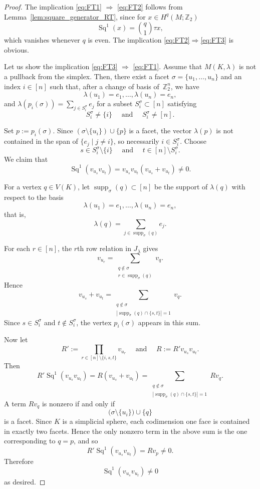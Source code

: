 \documentclass[10pt,a4paper]{amsart}
\DeclareMathOperator{\Sq}{Sq}
\newcommand{\Z}{\mathbb{Z}}
\newcommand{\supp}{\operatorname{supp}}
\begin{document}
\begin{proof}
    The implication \eqref{eq:FT1} $\Rightarrow$ \eqref{eq:FT2} follows from Lemma~\ref{lem:square_generator_RT}, since for $x \in H^q(M;\Z_2)$
    $$
    \Sq^1(x) = \binom{q}{1}\tau x,
    $$
    which vanishes whenever $q$ is even.
    The implication \eqref{eq:FT2}$\Rightarrow$\eqref{eq:FT3} is obvious.
    
    Let us show the implication \eqref{eq:FT3} $\Rightarrow$ \eqref{eq:FT1}.
    Assume that $M(K,\lambda)$ is not a pullback from the simplex. 
    Then, there exist a facet $\sigma=\{u_1,\dots,u_n\}$ and an index $i\in[n]$ such that, after a change of basis of~$\Z_2^n$, we have
    $$
        \lambda(u_1)=e_1,\dots,\lambda(u_n)=e_n,
    $$ and $\lambda(p_i (\sigma))=\sum_{j\in S_i^\sigma}e_j$ for a subset $S_i^\sigma \subset[n]$ satisfying
    $$
        S_i^\sigma \neq \{i\} \quad \text{ and }\quad S_i^\sigma \neq [n].
    $$
    
    Set $p:=p_i (\sigma)$.
    Since $(\sigma\setminus\{u_i\})\cup\{p\}$ is a facet, the vector $\lambda(p)$ is not contained in the span of $\{e_j\mid j\neq i\}$, so necessarily $i\in S_i^\sigma$.
    Choose
    $$
        s\in S_i^\sigma \setminus\{i\} \quad \text{ and } \quad t \in [n]\setminus S_i^\sigma.
    $$
    We claim that
    $$
        \Sq^1(v_{u_s} v_{u_t})= v_{u_s} v_{u_t}(v_{u_s} + v_{u_t})\neq 0.
    $$
    
    For a vertex $q \in V(K)$, let $\supp_\sigma(q)\subset[n]$ be the support of $\lambda(q)$ with respect to the basis
    $$
        \lambda(u_1)=e_1,\dots,\lambda(u_n)=e_n,
    $$
    that is,
    $$
        \lambda(q)=\sum_{j\in \supp_\sigma(q)} e_j.
    $$
    
    For each $r\in[n]$, the $r$th row relation in $J_\lambda$ gives
    $$
        v_{u_r} = \sum_{\substack{q\notin \sigma\\ r\in \supp_\sigma(q)}} v_q.
    $$
    Hence
    $$
    v_{u_s}+v_{u_t} = \sum_{\substack{q\notin \sigma\\ |\supp_\sigma(q)\cap\{s,t\}|=1}} v_q.
    $$
    Since $s\in S_i^\sigma$ and $t\notin S_i^\sigma$, the vertex $p_i(\sigma)$ appears in this sum.
    
    Now let
    $$
        R':=\prod_{r\in[n]\setminus\{i,s,t\}} v_{u_r} \quad \text{ and } \quad R := R' v_{u_s} v_{u_t}.
    $$
    Then
    $$
        R' \Sq^1(v_{u_s}v_{u_t}) = R(v_{u_s}+v_{u_t}) = \sum_{\substack{q\notin \sigma\\ |\supp_\sigma(q)\cap\{s,t\}|=1}} Rv_q.
    $$
    A term $Rv_q$ is nonzero if and only if
    $$
        \bigl(\sigma\setminus\{u_i\}\bigr)\cup\{q\}
    $$
    is a facet.
    Since $K$ is a simplicial sphere, each codimension one face is contained in exactly two facets. 
    Hence the only nonzero term in the above sum is the one corresponding to $q=p$, and so
    $$
        R'  \Sq^1(v_{u_s}v_{u_t}) = R v_{p}\neq 0.
    $$
    Therefore
    $$
        \Sq^1(v_{u_s}v_{u_t})\neq 0
    $$
    as desired.
\end{proof}
\end{document}
